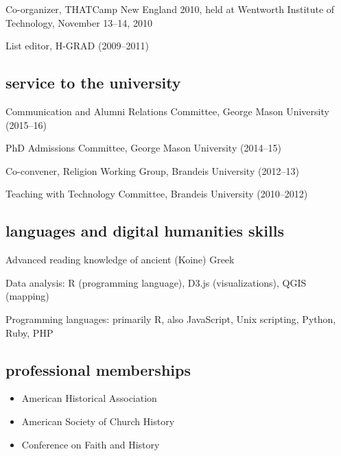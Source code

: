 \documentclass[11pt]{article}
\providecommand{\tightlist}{%
  \setlength{\itemsep}{0pt}\setlength{\parskip}{0pt}}
\begin{document}
Co-organizer, THATCamp New England 2010, held at Wentworth Institute of
Technology, November 13--14, 2010

List editor, H-GRAD (2009--2011)

\subsection{service to the university}\label{service-university}

Communication and Alumni Relations Committee, George Mason University 
(2015--16)

PhD Admissions Committee, George Mason University (2014--15)

Co-convener, Religion Working Group, Brandeis University (2012--13)

Teaching with Technology Committee, Brandeis University (2010--2012)

\subsection{languages and digital humanities
  skills}\label{languages-and-digital-humanities-skills}

Advanced reading knowledge of ancient (Koine) Greek

Data analysis: R (programming language), D3.js (visualizations), QGIS
(mapping)

Programming languages: primarily R, also JavaScript, Unix scripting, Python, 
Ruby, PHP

\subsection{professional memberships}\label{professional-memberships}

\begin{itemize}
    \tightlist
  \item
    American Historical Association
  \item
    American Society of Church History
  \item
    Conference on Faith and History
\end{itemize}
\end{document}
